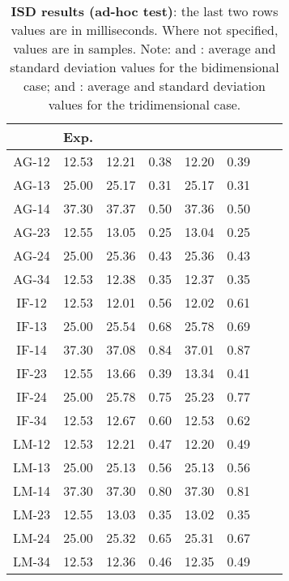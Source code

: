 \begin{table}[htbp]
  \begin{center}
  \begin{scriptsize}
	\begin{tabular}{|c|c|cc|cc|cc|}
	  \hline
	   & \textbf{Exp.} & \misds{2D} & \sisds{2D} & \misds{3D} & \sisds{3D}\\
	  \hline
	  AG-12 & 12.53 & 12.21 & 0.38 & 12.20 & 0.39\\
	  AG-13 & 25.00 & 25.17 & 0.31 & 25.17 & 0.31\\
	  AG-14 & 37.30 & 37.37 & 0.50 & 37.36 & 0.50\\
	  AG-23 & 12.55 & 13.05 & 0.25 & 13.04 & 0.25\\
	  AG-24 & 25.00 & 25.36 & 0.43 & 25.36 & 0.43\\
	  AG-34 & 12.53 & 12.38 & 0.35 & 12.37 & 0.35\\
	  \hline
	  IF-12 & 12.53 & 12.01 & 0.56 & 12.02 & 0.61\\
	  IF-13 & 25.00 & 25.54 & 0.68 & 25.78 & 0.69\\
	  IF-14 & 37.30 & 37.08 & 0.84 & 37.01 & 0.87\\
	  IF-23 & 12.55 & 13.66 & 0.39 & 13.34 & 0.41\\
	  IF-24 & 25.00 & 25.78 & 0.75 & 25.23 & 0.77\\
	  IF-34 & 12.53 & 12.67 & 0.60 & 12.53 & 0.62\\
	  \hline
	  LM-12 & 12.53 & 12.21 & 0.47 & 12.20 & 0.49\\
	  LM-13 & 25.00 & 25.13 & 0.56 & 25.13 & 0.56\\
	  LM-14 & 37.30 & 37.30 & 0.80 & 37.30 & 0.81\\
	  LM-23 & 12.55 & 13.03 & 0.35 & 13.02 & 0.35\\
	  LM-24 & 25.00 & 25.32 & 0.65 & 25.31 & 0.67\\
	  LM-34 & 12.53 & 12.36 & 0.46 & 12.35 & 0.49\\
	  \hline
  \end{tabular}
  \end{scriptsize}
  \end{center}
	\caption[ISD results (ad-hoc test)]{\textbf{ISD results (ad-hoc test)}:
	the last two rows values are in milliseconds. Where not
	specified, values are in samples.
	Note:  and : average and standard deviation values for 
	the bidimensional case;
	 and : average and standard deviation values for 
	the tridimensional case. 
	}
 \label {tab:linguometer:technical:isd:test}
\end{table}
